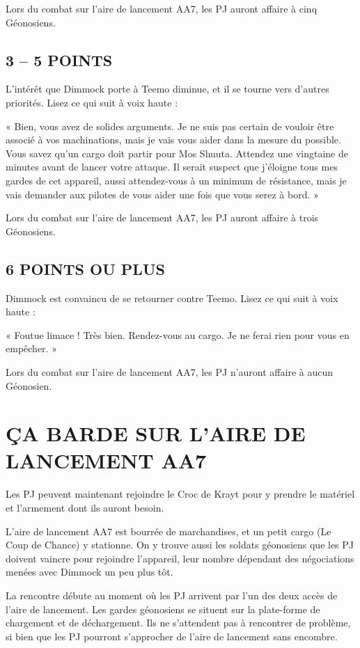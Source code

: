 \documentclass[a4paper,10pt,twoside,twocolumn,openany]{book}
\begin{document}
Lors du combat sur l’aire de lancement AA7, les PJ
auront affaire à cinq Géonosiens.

\subsection{3 – 5 POINTS}
L’intérêt que Dimmock porte à Teemo diminue, et il se
tourne vers d’autres priorités. Lisez ce qui suit à voix haute :

\begin{quotebox}
    
« Bien, vous avez de solides arguments. Je ne suis
pas certain de vouloir être associé à vos machinations, mais je vais vous aider dans la mesure du
possible. Vous savez qu’un cargo doit partir pour
Mos Shuuta. Attendez une vingtaine de minutes
avant de lancer votre attaque. Il serait suspect que
j’éloigne tous mes gardes de cet appareil, aussi attendez-vous à un minimum de résistance, mais je
vais demander aux pilotes de vous aider une fois
que vous serez à bord. »\end{quotebox}

Lors du combat sur l’aire de lancement AA7, les PJ
auront affaire à trois Géonosiens.

\subsection{6 POINTS OU PLUS}
Dimmock est convaincu de se retourner contre Teemo.
Lisez ce qui suit à voix haute :
\begin{quotebox}
« Foutue limace ! Très bien. Rendez-vous au cargo.
Je ne ferai rien pour vous en empêcher. »
\end{quotebox}
Lors du combat sur l’aire de lancement AA7, les PJ
n’auront affaire à aucun Géonosien.

\section{ÇA BARDE SUR L’AIRE DE
LANCEMENT AA7}
Les PJ peuvent maintenant rejoindre le Croc de Krayt pour
y prendre le matériel et l’armement dont ils auront besoin.

L’aire de lancement AA7 est bourrée de marchandises,
et un petit cargo (Le Coup de Chance) y stationne. On y
trouve aussi les soldats géonosiens que les PJ doivent
vaincre pour rejoindre l’appareil, leur nombre dépendant
des négociations menées avec Dimmock un peu plus tôt.

La rencontre débute au moment où les PJ arrivent par
l’un des deux accès de l’aire de lancement. Les gardes
géonosiens se situent sur la plate-forme de chargement
et de déchargement. Ils ne s’attendent pas à rencontrer
de problème, si bien que les PJ pourront s’approcher de
l’aire de lancement sans encombre.
\end{document}
